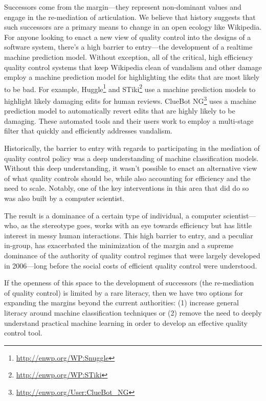 Successors come from the margin---they represent non-dominant values and engage in the re-mediation of articulation\cite{mugar2017preserving}.  We believe that history suggests that such successors are a primary means to change in an open ecology like Wikipedia.  For anyone looking to enact a new view of quality control into the designs of a software system, there's a high barrier to entry---the development of a realtime machine prediction model.  Without exception, all of the critical, high efficiency quality control systems that keep Wikipedia clean of vandalism and other damage employ a machine prediction model for highlighting the edits that are most likely to be bad. For example, Huggle\footnote{\url{http://enwp.org/WP:Snuggle}} and STiki\footnote{\url{http://enwp.org/WP:STiki}} use a machine prediction models to highlight likely damaging edits for human reviews.  ClueBot NG\footnote{\url{http://enwp.org/User:ClueBot_NG}} uses a machine prediction model to automatically revert edits that are highly likely to be damaging.  These automated tools and their users work to employ a multi-stage filter that quickly and efficiently addresses vandalism\cite{geiger2013levee}.

Historically, the barrier to entry with regards to participating in the mediation of quality control policy was a deep understanding of machine classification models.  Without this deep understanding, it wasn't possible to enact an alternative view of what quality controls should be, while also accounting for efficiency and the need to scale.  Notably, one of the key interventions in this area that did do so was also built by a computer scientist\cite{halfaker2014snuggle}.

The result is a dominance of a certain type of individual, a computer scientist---who, as the stereotype goes, works with an eye towards efficiency but has little interest in messy human interactions.  This high barrier to entry, and a peculiar in-group, has exacerbated the minimization of the margin and a supreme dominance of the authority of quality control regimes that were largely developed in 2006---long before the social costs of efficient quality control were understood.

If the openness of this space to the development of successors (the re-mediation of quality control) is limited by a rare literacy, then we have two options for expanding the margins beyond the current authorities: (1) increase general literacy around machine classification techniques or (2) remove the need to deeply understand practical machine learning in order to develop an effective quality control tool.

